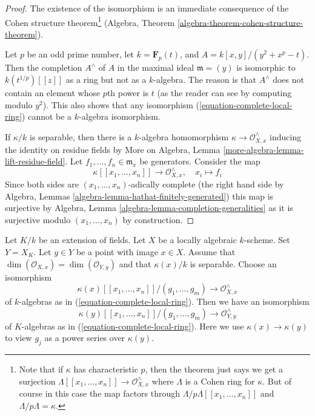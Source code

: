 \begin{proof}
The existence of the isomorphism is an immediate consequence of
the Cohen structure theorem\footnote{Note that if $\kappa$ has
characteristic $p$, then the theorem just says we get a surjection
$\Lambda[[x_1, \ldots, x_n]] \to \mathcal{O}_{X, x}^\wedge$ where
$\Lambda$ is a Cohen ring for $\kappa$. But of course in this
case the map factors through $\Lambda/p\Lambda[[x_1, \ldots, x_n]]$
and $\Lambda/p\Lambda = \kappa$.}
(Algebra, Theorem \ref{algebra-theorem-cohen-structure-theorem}).

\medskip\noindent
Let $p$ be an odd prime number, let $k = \mathbf{F}_p(t)$, and
$A = k[x, y]/(y^2 + x^p - t)$. Then the completion $A^\wedge$ of $A$
in the maximal ideal
$\mathfrak m = (y)$ is isomorphic to $k(t^{1/p})[[z]]$ as a ring
but not as a $k$-algebra. The reason is that $A^\wedge$
does not contain an element whose $p$th power is $t$ (as the reader
can see by computing modulo $y^2$).
This also shows that any isomorphism (\ref{equation-complete-local-ring})
cannot be a $k$-algebra isomorphism.

\medskip\noindent
If $\kappa/k$ is separable, then there is a $k$-algebra
homomorphism $\kappa \to \mathcal{O}_{X, x}^\wedge$
inducing the identity on residue fields by
More on Algebra, Lemma \ref{more-algebra-lemma-lift-residue-field}.
Let $f_1, \ldots, f_n \in \mathfrak m_x$ be generators.
Consider the map
$$
\kappa[[x_1, \ldots, x_n]] \longrightarrow \mathcal{O}_{X, x}^\wedge,\quad
x_i \longmapsto f_i
$$
Since both sides are $(x_1, \ldots, x_n)$-adically complete
(the right hand side by
Algebra, Lemmas \ref{algebra-lemma-hathat-finitely-generated})
this map is surjective by
Algebra, Lemma \ref{algebra-lemma-completion-generalities}
as it is surjective modulo $(x_1, \ldots, x_n)$ by
construction.
\end{proof}

\begin{lemma}
\label{lemma-base-change-complete-local-ring}
Let $K/k$ be an extension of fields. Let $X$ be a locally algebraic
$k$-scheme. Set $Y = X_K$. Let $y \in Y$ be a point with image $x \in X$.
Assume that $\dim(\mathcal{O}_{X, x}) = \dim(\mathcal{O}_{Y, y})$
and that $\kappa(x)/k$ is separable.
Choose an isomorphism
$$
\kappa(x)[[x_1, \ldots, x_n]]/(g_1, \ldots, g_m) \longrightarrow
\mathcal{O}_{X, x}^\wedge
$$
of $k$-algebras as in (\ref{equation-complete-local-ring}).
Then we have an isomorphism
$$
\kappa(y)[[x_1, \ldots, x_n]]/(g_1, \ldots, g_m) \longrightarrow
\mathcal{O}_{Y, y}^\wedge
$$
of $K$-algebras as in (\ref{equation-complete-local-ring}). Here we use
$\kappa(x) \to \kappa(y)$ to view $g_j$ as a power series
over $\kappa(y)$.
\end{lemma}

